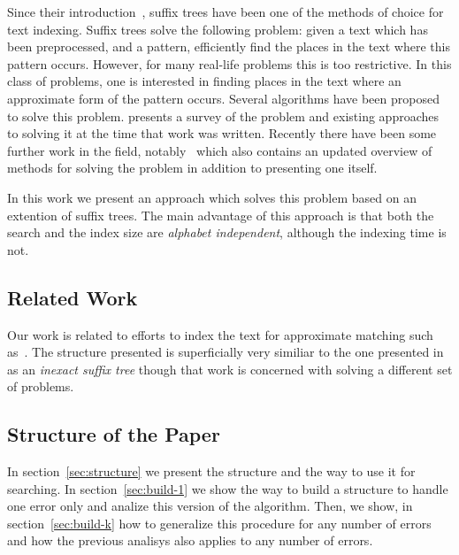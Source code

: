 Since their introduction~\cite{weiner}, suffix trees have been one of the methods of choice for text indexing. Suffix trees solve the following problem: given a text which has been preprocessed, and a pattern, efficiently find the places in the text where this pattern occurs.  However, for many real-life problems this is too restrictive. In this class of problems, one is interested in finding places in the text where an approximate form of the pattern occurs. Several algorithms have been proposed to solve this problem. \cite{navarro:guided} presents a survey of the problem and existing approaches to solving it at the time that work was written. Recently there have been some further work in the field, notably~\cite{maass:text} which also contains an updated overview of methods for solving the problem in addition to presenting one itself.

In this work we present an approach which solves this problem based on an extention of suffix trees. The main advantage of this approach is that both the search and the index size are \emph{alphabet independent}, although the indexing time is not.

\subsection{Related Work}

Our work is related to efforts to index the text for approximate matching such as~\cite{maass:text,mosche}. The structure presented is superficially very similiar to the one presented in~\cite{inexact} as an \textit{inexact suffix tree} though that work is concerned with solving a different set of problems.

\subsection{Structure of the Paper}

In section~\ref{sec:structure} we present the structure and the way to use it for searching. In section~\ref{sec:build-1} we show the way to build a structure to handle one error only and analize this version of the algorithm. Then, we show, in section~\ref{sec:build-k} how to generalize this procedure for any number of errors and how the previous analisys also applies to any number of errors.

